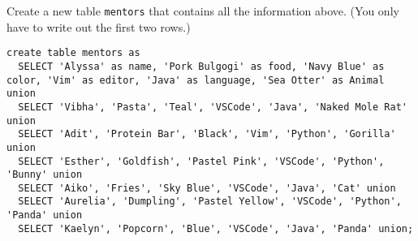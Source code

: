 \question Create a new table \lstinline$mentors$ that contains all the information above.
(You only have to write out the first two rows.)

\begin{solution}[3in]
\begin{lstlisting}
create table mentors as
  SELECT 'Alyssa' as name, 'Pork Bulgogi' as food, 'Navy Blue' as color, 'Vim' as editor, 'Java' as language, 'Sea Otter' as Animal union
  SELECT 'Vibha', 'Pasta', 'Teal', 'VSCode', 'Java', 'Naked Mole Rat' union
  SELECT 'Adit', 'Protein Bar', 'Black', 'Vim', 'Python', 'Gorilla' union
  SELECT 'Esther', 'Goldfish', 'Pastel Pink', 'VSCode', 'Python', 'Bunny' union
  SELECT 'Aiko', 'Fries', 'Sky Blue', 'VSCode', 'Java', 'Cat' union
  SELECT 'Aurelia', 'Dumpling', 'Pastel Yellow', 'VSCode', 'Python', 'Panda' union
  SELECT 'Kaelyn', 'Popcorn', 'Blue', 'VSCode', 'Java', 'Panda' union;
\end{lstlisting}
\end{solution}
